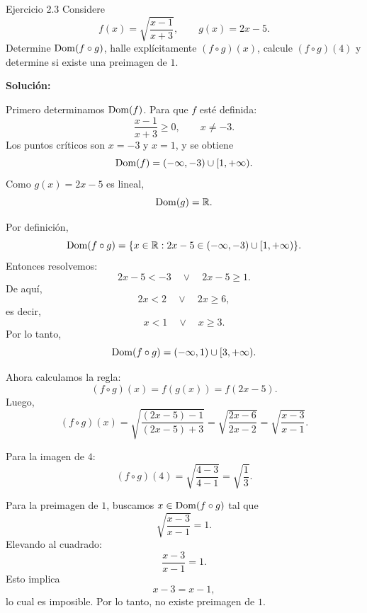 \documentclass[letterpaper, 12pt]{article}
\begin{document}
\begin{solucionbox}{Ejercicio 2.3}
Considere
\[
    f(x)=\sqrt{\frac{x-1}{x+3}},
    \qquad
    g(x)=2x-5.
\]
Determine $\operatorname{Dom}(f\circ g)$, halle expl\'icitamente $(f\circ g)(x)$, calcule $(f\circ g)(4)$ y determine si existe una preimagen de $1$.

\textbf{Soluci\'on:}

Primero determinamos $\operatorname{Dom}(f)$. Para que $f$ est\'e definida:
\[
    \frac{x-1}{x+3}\geq 0,
    \qquad x\neq -3.
\]
Los puntos cr\'iticos son $x=-3$ y $x=1$, y se obtiene
\[
    \operatorname{Dom}(f)=(-\infty,-3)\cup[1,+\infty).
\]
Como $g(x)=2x-5$ es lineal,
\[
    \operatorname{Dom}(g)=\mathbb{R}.
\]

Por definici\'on,
\[
    \operatorname{Dom}(f\circ g)=\{x\in\mathbb{R}:2x-5\in(-\infty,-3)\cup[1,+\infty)\}.
\]
Entonces resolvemos:
\[
    2x-5<-3
    \quad\vee\quad
    2x-5\geq 1.
\]
De aqu\'i,
\[
    2x<2 \quad\vee\quad 2x\geq 6,
\]
es decir,
\[
    x<1 \quad\vee\quad x\geq 3.
\]
Por lo tanto,
\[
    \operatorname{Dom}(f\circ g)=(-\infty,1)\cup[3,+\infty).
\]

Ahora calculamos la regla:
\[
    (f\circ g)(x)=f(g(x))=f(2x-5).
\]
Luego,
\[
    (f\circ g)(x)
    =\sqrt{\frac{(2x-5)-1}{(2x-5)+3}}
    =\sqrt{\frac{2x-6}{2x-2}}
    =\sqrt{\frac{x-3}{x-1}}.
\]

Para la imagen de $4$:
\[
    (f\circ g)(4)
    =\sqrt{\frac{4-3}{4-1}}
    =\sqrt{\frac13}.
\]

Para la preimagen de $1$, buscamos $x\in\operatorname{Dom}(f\circ g)$ tal que
\[
    \sqrt{\frac{x-3}{x-1}}=1.
\]
Elevando al cuadrado:
\[
    \frac{x-3}{x-1}=1.
\]
Esto implica
\[
    x-3=x-1,
\]
lo cual es imposible. Por lo tanto, no existe preimagen de $1$.

\respuesta{$\Dom(f\circ g)=(-\infty,1)\cup[3,+\infty)$, $(f\circ g)(x)=\sqrt{\dfrac{x-3}{x-1}}$, $(f\circ g)(4)=\sqrt{\dfrac13}$ y no existe preimagen de $1$.}
\end{solucionbox}
\end{document}
